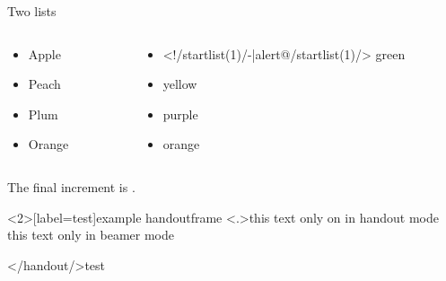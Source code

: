 \documentclass[\jobname]{beamer} %
\begin{document}
\begin{examp}
  \resetincr
  \begin{center}
    Two lists \\
  \end{center}
  \begin{columns}
    \begin{column}{.2\textwidth}
      \begin{itemize}[<+-| alert@+>]
      \item Apple \item Peach  \item Plum \item Orange
      \end{itemize}
    \end{column}
    \begin{column}{.2\textwidth}
      \begin{itemize}[<+-| alert@+>]
      \item<!/startlist(1)/-|alert@/startlist(1)/> green \item yellow \item purple \item orange
      \end{itemize}
    \end{column}
  \end{columns}
  \vfill
  \onslide<+->
  The final increment is . 
\end{examp}



\begin{examp}
  \resetincr[2]
\end{examp}

\begin{frame}<2>[label=test]{example handoutframe}
  \resetincr
  \only<.>{this text only on in handout mode\\}
  \onslide<+->
  this text only in beamer mode\\
\end{frame}

</handout/>{test}
\end{document}
